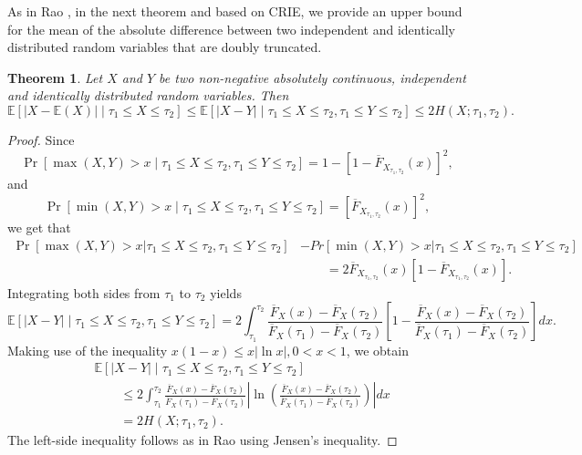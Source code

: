 \documentclass[11pt]{article}
\newtheorem{theorem}{Theorem}
\begin{document}
As in Rao \cite[Section 5]{Rao2005}, in the next theorem and based on CRIE, we provide an upper bound for the mean of the absolute difference between two independent and identically distributed random variables that are doubly truncated.

 
\begin{theorem} 
	Let $X$ and $Y$ be two non-negative absolutely continuous, independent and identically distributed random variables. Then
	$$ \textstyle \mathbb{E}[|X - \mathbb{E}(X)| \mid \tau_1 \leq X \leq \tau_2] \leq \mathbb{E}[|X - Y| \mid \tau_1 \leq X \leq \tau_2, \tau_1 \leq Y \leq \tau_2] \leq 2 H(X;\tau_1,\tau_2). $$
\end{theorem}

\begin{proof}
	Since
	$$ \textstyle \Pr[\max(X,Y) > x \mid \tau_1 \leq X \leq \tau_2, \tau_1 \leq Y \leq \tau_2] = 1 - [1 - \overline{F}_{X_{\tau_1,\tau_2}}(x)]^2, $$
	and
	$$ \textstyle \Pr[\min(X,Y) > x \mid \tau_1 \leq X \leq \tau_2, \tau_1 \leq Y \leq \tau_2] = [\overline{F}_{X_{\tau_1,\tau_2}}(x)]^2, $$
	we get that
	\begin{align*} 
			 \textstyle \Pr[\max(X,Y)>x|\tau_1 \leq X\leq \tau_2, \tau_1 \leq Y\leq \tau_2]&-Pr[\min(X,Y)>x|\tau_1 \leq X\leq \tau_2, \tau_1\leq Y \leq \tau_2] \\
			& \qquad = 2 \overline{F}_{X_{\tau_1,\tau_2}}(x)[1-\overline{F}_{X_{\tau_1,\tau_2}}(x)].
	\end{align*}
	Integrating both sides from $\tau_1$ to $\tau_2$ yields
	$$ \textstyle \mathbb{E}[|X - Y| \mid \tau_1 \leq X \leq \tau_2, \tau_1 \leq Y \leq \tau_2] = 2 \int_{\tau_1}^{\tau_2} \frac{\overline{F}_X(x) - \overline{F}_X(\tau_2)}{\overline{F}_X(\tau_1) - \overline{F}_X(\tau_2)} \left[ 1 - \frac{\overline{F}_X(x) - \overline{F}_X(\tau_2)}{\overline{F}_X(\tau_1) - \overline{F}_X(\tau_2)} \right] dx. $$
	Making use of the inequality $x(1 - x) \leq x |\ln x|, 0 < x < 1$, we obtain
	\begin{align*} 
		& \textstyle \mathbb{E}[|X - Y| \mid \tau_1 \leq X\leq \tau_2, \tau_1\leq Y \leq \tau_2] \\
		& \textstyle \qquad \leq 2 \int_{\tau_1}^{\tau_2} \frac{\overline{F}_X(x) - \overline{F}_X(\tau_2)}{\overline{F}_X(\tau_1) - \overline{F}_X(\tau_2)} \left| \ln \left( \frac{\overline{F}_X(x) - \overline{F}_X(\tau_2)}{\overline{F}_X(\tau_1) - \overline{F}_X(\tau_2)} \right) \right| dx \\
		& \textstyle \qquad = 2 H(X;\tau_1,\tau_2). 
	\end{align*}
	The left-side inequality follows as in Rao \cite{Rao2005} using Jensen's inequality.
\end{proof}
\end{document}
